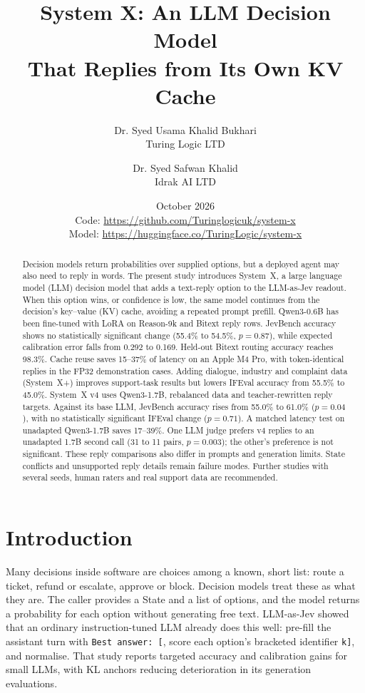 \documentclass[11pt]{article}
\title{System X: An LLM Decision Model\\That Replies from Its Own KV Cache}
\author{Dr. Syed Usama Khalid Bukhari\\
\small Turing Logic LTD
\and
Dr. Syed Safwan Khalid\\
\small Idrak AI LTD}
\date{October 2026\\[0.5em]
\small Code: \url{https://github.com/Turinglogicuk/system-x}\\
Model: \url{https://huggingface.co/TuringLogic/system-x}}
\begin{document}
\maketitle

\begin{abstract}
Decision models return probabilities over supplied options, but a deployed agent may also need to reply in words. The present study introduces System~X, a large language model (LLM) decision model that adds a text-reply option to the LLM-as-Jev readout. When this option wins, or confidence is low, the same model continues from the decision's key--value (KV) cache, avoiding a repeated prompt prefill. Qwen3-0.6B has been fine-tuned with LoRA on Reason-9k and Bitext reply rows. JevBench accuracy shows no statistically significant change (55.4\% to 54.5\%, $p=0.87$), while expected calibration error falls from 0.292 to 0.169. Held-out Bitext routing accuracy reaches 98.3\%. Cache reuse saves 15--37\% of latency on an Apple M4 Pro, with token-identical replies in the FP32 demonstration cases. Adding dialogue, industry and complaint data (System~X+) improves support-task results but lowers IFEval accuracy from 55.5\% to 45.0\%. System~X v4 uses Qwen3-1.7B, rebalanced data and teacher-rewritten reply targets. Against its base LLM, JevBench accuracy rises from 55.0\% to 61.0\% ($p=0.04$), with no statistically significant IFEval change ($p=0.71$). A matched latency test on unadapted Qwen3-1.7B saves 17--39\%. One LLM judge prefers v4 replies to an unadapted 1.7B second call (31 to 11 pairs, $p=0.003$); the other's preference is not significant. These reply comparisons also differ in prompts and generation limits. State conflicts and unsupported reply details remain failure modes. Further studies with several seeds, human raters and real support data are recommended.
\end{abstract}

\section{Introduction}

Many decisions inside software are choices among a known, short list: route a ticket, refund or escalate, approve or block. Decision models \citep{almeida2026jev} treat these as what they are. The caller provides a State and a list of options, and the model returns a probability for each option without generating free text. LLM-as-Jev \citep{li2026llmasjev} showed that an ordinary instruction-tuned LLM already does this well: pre-fill the assistant turn with \texttt{Best answer: [}, score each option's bracketed identifier \texttt{k]}, and normalise. That study reports targeted accuracy and calibration gains for small LLMs, with KL anchors reducing deterioration in its generation evaluations.
\end{document}
